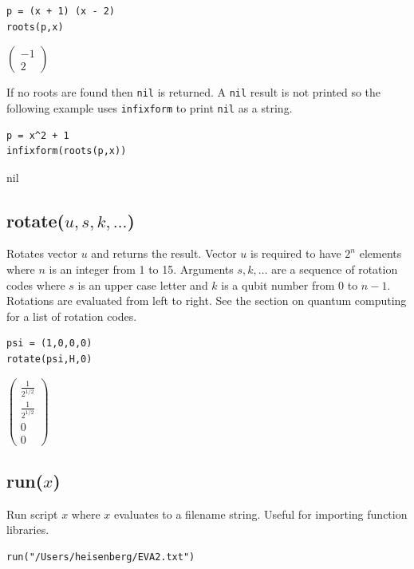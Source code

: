 {\color{blue}
\begin{verbatim}
p = (x + 1) (x - 2)
roots(p,x)
\end{verbatim}
}

$\displaystyle
\begin{pmatrix}
-1
\\[1ex]
2
\end{pmatrix}
$

\bigskip
If no roots are found then \verb$nil$ is returned.
A \verb$nil$ result is not printed so the following example uses
\verb$infixform$ to print \verb$nil$ as a string.

{\color{blue}
\begin{verbatim}
p = x^2 + 1
infixform(roots(p,x))
\end{verbatim}
}

nil

\subsection*{rotate($u,s,k,\ldots$)}
Rotates vector $u$ and returns the result.
Vector $u$ is required to have $2^n$ elements where
$n$ is an integer from 1 to 15.
Arguments $s,k,\ldots$ are a sequence of rotation codes
where $s$ is an upper case letter and $k$ is a qubit number
from 0 to $n-1$.
Rotations are evaluated from left to right.
See the section on quantum computing for a list of rotation codes.

{\color{blue}
\begin{verbatim}
psi = (1,0,0,0)
rotate(psi,H,0)
\end{verbatim}
}

$
\begin{pmatrix}
\frac{1}{2^{1/2}}
\\[1ex]
\frac{1}{2^{1/2}}
\\[1ex]
0
\\[1ex]
0
\end{pmatrix}
$

\subsection*{run($x$)}

Run script $x$ where $x$ evaluates to a filename string.
Useful for importing function libraries.

{\color{blue}
\begin{verbatim}
run("/Users/heisenberg/EVA2.txt")
\end{verbatim}
}

